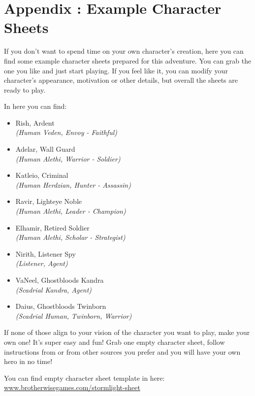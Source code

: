 \chapter{Appendix \thechapter{}: Example Character Sheets}
\label{chap:exampleSheets}

If you don't want to spend time on your own character's creation, here you can find some example character sheets prepared for this adventure. You can grab the one you like and just start playing. If you feel like it, you can modify your character's appearance, motivation or other details, but overall the sheets are ready to play.

In here you can find:
\begin{itemize}
	\item Rish, Ardent 				\\ \textit{(Human Veden, Envoy - Faithful)}
	\item Adelar, Wall Guard 		\\ \textit{(Human Alethi, Warrior - Soldier)}
	\item Katleio, Criminal 		\\ \textit{(Human Herdzian, Hunter - Assassin)}
	\item Ravir, Lighteye Noble 	\\ \textit{(Human Alethi, Leader - Champion)}
	\item Elhamir, Retired Soldier 	\\ \textit{(Human Alethi, Scholar - Strategist)}
	\item Nirith, Listener Spy 		\\ \textit{(Listener, Agent)}
	\item VaNeel, Ghostbloods Kandra\\ \textit{(Scadrial Kandra, Agent)}
	\item Daius, Ghostbloods Twinborn\\ \textit{(Scadrial Human, Twinborn, Warrior)}
\end{itemize}
\newpage 

If none of those align to your vision of the character you want to play, make your own one! It's super easy and fun! Grab one empty character sheet, follow instructions from \handbook{} or from other sources you prefer and you will have your own hero in no time!

You can find empty character sheet template in here: \\

\href{https://www.brotherwisegames.com/stormlight-sheet}{www.brotherwisegames.com/stormlight-sheet}
\newpage










